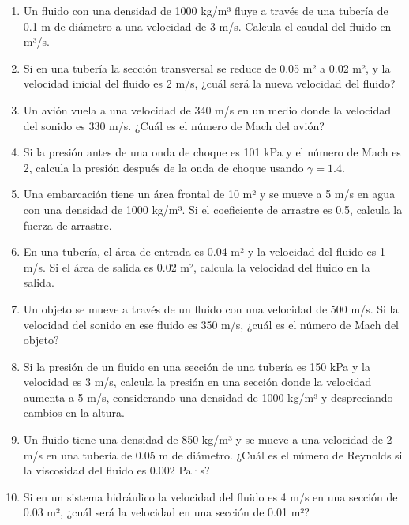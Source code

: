\documentclass[../main]{subfiles}
\begin{document}
\begin{enumerate}
    \item Un fluido con una densidad de 1000 kg/m³ fluye a través de una tubería de 0.1 m de diámetro a una velocidad de 3 m/s. Calcula el caudal del fluido en m³/s.
    \item Si en una tubería la sección transversal se reduce de 0.05 m² a 0.02 m², y la velocidad inicial del fluido es 2 m/s, ¿cuál será la nueva velocidad del fluido?
    \item Un avión vuela a una velocidad de 340 m/s en un medio donde la velocidad del sonido es 330 m/s. ¿Cuál es el número de Mach del avión?
    \item Si la presión antes de una onda de choque es 101 kPa y el número de Mach es 2, calcula la presión después de la onda de choque usando $\gamma = 1.4$.
    \item Una embarcación tiene un área frontal de 10 m² y se mueve a 5 m/s en agua con una densidad de 1000 kg/m³. Si el coeficiente de arrastre es 0.5, calcula la fuerza de arrastre.
    \item En una tubería, el área de entrada es 0.04 m² y la velocidad del fluido es 1 m/s. Si el área de salida es 0.02 m², calcula la velocidad del fluido en la salida.
    \item Un objeto se mueve a través de un fluido con una velocidad de 500 m/s. Si la velocidad del sonido en ese fluido es 350 m/s, ¿cuál es el número de Mach del objeto?
    \item Si la presión de un fluido en una sección de una tubería es 150 kPa y la velocidad es 3 m/s, calcula la presión en una sección donde la velocidad aumenta a 5 m/s, considerando una densidad de 1000 kg/m³ y despreciando cambios en la altura.
    \item Un fluido tiene una densidad de 850 kg/m³ y se mueve a una velocidad de 2 m/s en una tubería de 0.05 m de diámetro. ¿Cuál es el número de Reynolds si la viscosidad del fluido es 0.002 Pa·s?
    \item Si en un sistema hidráulico la velocidad del fluido es 4 m/s en una sección de 0.03 m², ¿cuál será la velocidad en una sección de 0.01 m²?
\end{enumerate}
\end{document}
